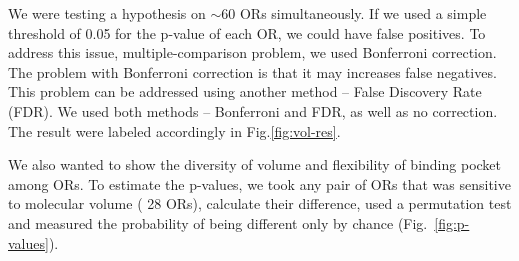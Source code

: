 \documentclass[11pt]{paper} %
\newcommand{\numberofreceptors}{ 28 }
\begin{document}
We were testing a hypothesis on $\sim$60 ORs simultaneously. 
If we used a simple threshold of 0.05 for the p-value of each OR, we could have false positives. 
To address this issue, multiple-comparison problem, 
we used Bonferroni correction. 
The problem with Bonferroni correction is that it may increases false negatives.
This problem can be addressed using another method -- False Discovery Rate (FDR).
We used both methods -- Bonferroni and FDR, as well as no correction. 
The result were labeled accordingly in Fig.\ref{fig:vol-res}.

We also wanted to show the diversity of volume and flexibility of binding pocket among ORs.
To estimate the p-values, 
we took any pair of ORs that was sensitive to molecular volume (\numberofreceptors ORs),
calculate their difference, 
used a permutation test and measured the probability of being different only by chance (Fig.~\ref{fig:p-values}).

\end{document}
